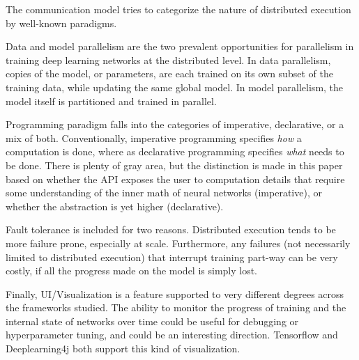 The communication model tries to categorize the nature of distributed execution by well-known paradigms. 

Data and model parallelism are the two prevalent opportunities for parallelism in training deep learning networks at the distributed level. In data parallelism, copies of the model, or parameters, are each trained on its own subset of the training data, while updating the same global model. In model parallelism, the model itself is partitioned and trained in parallel. 

Programming paradigm falls into the categories of imperative, declarative, or a mix of both. Conventionally, imperative programming specifies \textit{how} a computation is done, where as declarative programming specifies \textit{what} needs to be done. There is plenty of gray area, but the distinction is made in this paper based on whether the API exposes the user to computation details that require some understanding of the inner math of neural networks (imperative), or whether the abstraction is yet higher (declarative). 

Fault tolerance is included for two reasons. Distributed execution tends to be more failure prone, especially at scale. Furthermore, any failures (not necessarily limited to distributed execution) that interrupt training part-way can be very costly, if all the progress made on the model is simply lost. 

Finally, UI/Visualization is a feature supported to very different degrees across the frameworks studied. The ability to monitor the progress of training and the internal state of networks over time could be useful for debugging or hyperparameter tuning, and could be an interesting direction. Tensorflow and Deeplearning4j both support this kind of visualization. 
